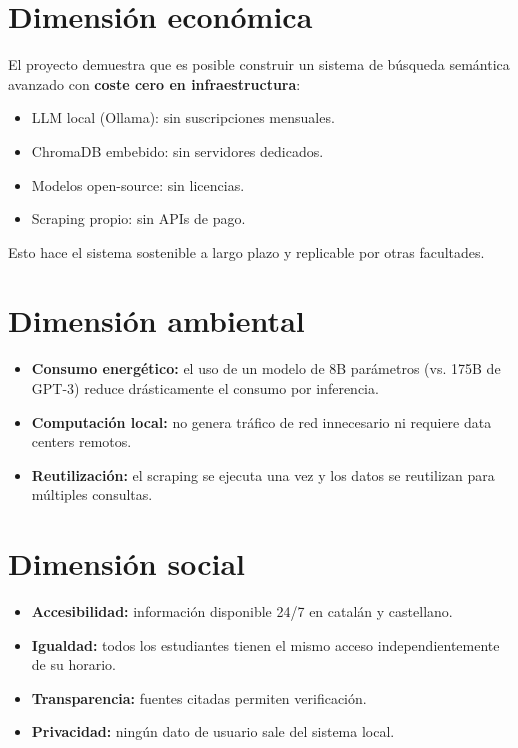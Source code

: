 \documentclass[12pt, a4paper, twoside]{report}
\begin{document}
\section{Dimensi\'on econ\'omica}

El proyecto demuestra que es posible construir un sistema de b\'usqueda sem\'antica avanzado con \textbf{coste cero en infraestructura}:

\begin{itemize}
  \item LLM local (Ollama): sin suscripciones mensuales.
  \item ChromaDB embebido: sin servidores dedicados.
  \item Modelos open-source: sin licencias.
  \item Scraping propio: sin APIs de pago.
\end{itemize}

Esto hace el sistema sostenible a largo plazo y replicable por otras facultades.

\section{Dimensi\'on ambiental}

\begin{itemize}
  \item \textbf{Consumo energ\'etico:} el uso de un modelo de 8B par\'ametros (vs. 175B de GPT-3) reduce dr\'asticamente el consumo por inferencia.
  \item \textbf{Computaci\'on local:} no genera tr\'afico de red innecesario ni requiere data centers remotos.
  \item \textbf{Reutilizaci\'on:} el scraping se ejecuta una vez y los datos se reutilizan para m\'ultiples consultas.
\end{itemize}

\section{Dimensi\'on social}

\begin{itemize}
  \item \textbf{Accesibilidad:} informaci\'on disponible 24/7 en catal\'an y castellano.
  \item \textbf{Igualdad:} todos los estudiantes tienen el mismo acceso independientemente de su horario.
  \item \textbf{Transparencia:} fuentes citadas permiten verificaci\'on.
  \item \textbf{Privacidad:} ning\'un dato de usuario sale del sistema local.
\end{itemize}
\end{document}
